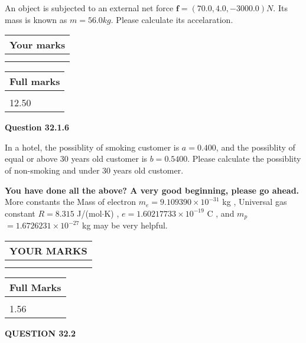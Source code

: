 \documentclass[12pt]{article}
\begin{document}
  
 
An object is subjected to an external net force $\mathbf{f}=(
70.0,  %
4.0,
-3000.0  )N$. Its mass is known as
$m= %
56.0 kg$. Please calculate its accelaration.
 
 

 

 
\vspace{0.3in}
  
\vspace{0.2in}
  
         \begin{tabular}{|l|}
\hline
 Your marks  \\
\hline
 \\ 
 \\ 
\hline
\end{tabular}
\hspace{0.05in} \begin{tabular}{|l|}
\hline
 Full marks  \\
\hline
 \\ 
12.50 \\
\hline
\end{tabular}
{\textbf{\Large{Question
32.1.6 
}}}
  
  
In a hotel, the possiblity of  %
smoking customer is
$a =  %
0.400$, and the possiblity of  %
equal or above 30 years old customer is $ b =  %
0.5400$.
Please calculate the possiblity of  %
 non-smoking and  %
under 30 years old customer.
 

 

 
\vspace{0.3in}
   
   
\vspace{0.3in}
{\textbf{\LARGE{You have done all the above? A very good beginning, please go ahead.}}}
More constants the
Mass of electron
$m_e$$ =
9.109390 \times 10^{-31} $
kg
,
Universal gas constant
$R$$ =
8.315 $
J/(mol$\cdot $K)
,
$e$$ =
1.60217733 \times 10^{-19} $
C
, and
$m_p$$ =
1.6726231 \times 10^{-27} $
kg
%
may be very helpful.
\vspace{0.3in}
   
   
  
\vspace{0.2in}
  
\noindent\begin{tabular}{|l|}
\hline
 YOUR MARKS  \\
\hline
 \\ 
 \\ 
\hline
\end{tabular}
\hspace{0.05in} \begin{tabular}{|l|}
\hline
 Full Marks  \\
\hline
 \\ 
1.56 \\
\hline
\end{tabular}
{\textbf{\Large{QUESTION
32.2 
}}}
  
\end{document}
